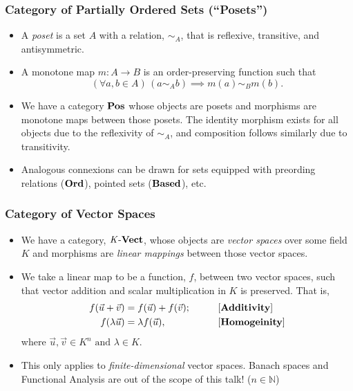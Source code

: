 \documentclass{beamer}
\numberwithin{figure}{section}
\begin{document}
\begin{frame}
        \frametitle{Category of Partially Ordered Sets (``Posets'')}
        \begin{itemize}
                \item A \emph{poset} is a set $A$ with a relation, $\sim_A$,
                        that is reflexive, transitive, and antisymmetric.
                \item A monotone map $m \colon A \to B $ is an
                        order-preserving function such that
                        \begin{equation*}
                                (\forall a, b\in A)\,(a \sim_A b)
                                \implies m(a) \sim_B m(b).
                        \end{equation*}
                \item We have a category $\operatorname{\mathbf{Pos}}$ whose objects are posets and
                        morphisms are monotone maps between those posets. The
                        identity morphism exists for all objects due to the
                        reflexivity of $\sim_A$, and composition follows
                        similarly due to transitivity.
                \item Analogous connexions can be drawn for sets equipped with
                        preording relations ($\operatorname{\mathbf{Ord}}$), pointed sets
                        ($\operatorname{\mathbf{Based}}$), etc.
        \end{itemize}
\end{frame}

\begin{frame}
        \frametitle{Category of Vector Spaces}
        \begin{itemize}
                \item We have a category, $\operatorname{\mathit{K}-\mathbf{Vect}}$, whose objects are
                        \emph{vector spaces} over some field $K$ and morphisms
                        are \emph{linear mappings} between those vector spaces.
                \item We take a linear map to be a function, $f$, between two
                        vector spaces, such that vector addition and scalar
                        multiplication in $K$ is preserved. That is,
                        \begin{alignat*}{2}
                                f(\vec{u}+\vec{v}) &= f(\vec{u})+f(\vec{v});
                                \qquad && \text{[\textbf{Additivity}]} \\
                                f(\lambda\vec{u}) &= \lambda f(\vec{u}),
                                \qquad && \text{[\textbf{Homogeinity}]}
                        \end{alignat*}
                        where $\vec{u},\vec{v}\in K^n \text{ and }\lambda\in K$.
                \item This only applies to \emph{finite-dimensional} vector
                        spaces. Banach spaces and Functional Analysis are out of
                        the scope of this talk! ($n\in\mathbb{N}$)
        \end{itemize}
\end{frame}
\end{document}
